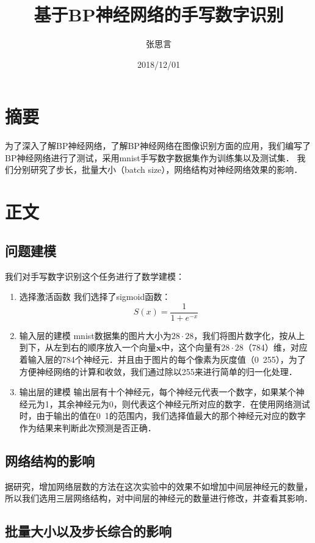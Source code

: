 \documentclass[UTF8]{article}
\begin{document}
\title{基于BP神经网络的手写数字识别}
\author{张思言}
\date{2018/12/01}
\maketitle

  \section{摘要}
  为了深入了解BP神经网络，了解BP神经网络在图像识别方面的应用，我们编写了BP神经网络进行了测试，采用mnist手写数字数据集作为训练集以及测试集．
  我们分别研究了步长，批量大小（batch size），网络结构对神经网络效果的影响．

  \section{正文}

  \subsection{问题建模}
  我们对手写数字识别这个任务进行了数学建模：
  \begin{enumerate}
    \item 选择激活函数
      我们选择了sigmoid函数：
      \begin{equation}
        S(x) = \frac{1}{1+e^{-x}}
      \end{equation}
    \item 输入层的建模
      mnist数据集的图片大小为$28\cdot 28$，我们将图片数字化，按从上到下，从左到右的顺序放入一个向量$\textbf{x}$中，这个向量有$28\cdot28$（784）维，对应着输入层的784个神经元．并且由于图片的每个像素为灰度值（0~255），为了方便神经网络的计算和收敛，我们通过除以255来进行简单的归一化处理．
    \item 输出层的建模
      输出层有十个神经元，每个神经元代表一个数字，如果某个神经元为1，其余神经元为0，则代表这个神经元所对应的数字．在使用网络测试时，由于输出的值在0~1的范围内，我们选择值最大的那个神经元对应的数字作为结果来判断此次预测是否正确．
  \end{enumerate}

  \subsection{网络结构的影响}
  据研究，增加网络层数的方法在这次实验中的效果不如增加中间层神经元的数量，所以我们选用三层网络结构，对中间层的神经元的数量进行修改，并查看其影响．

  \subsection{批量大小以及步长综合的影响}
\end{document}
